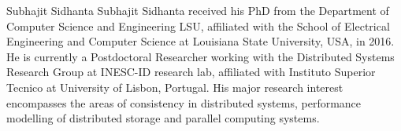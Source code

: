 \documentclass[journal,compsoc]{IEEEtran}
\begin{document}
%   
\begin{IEEEbiography}{Subhajit Sidhanta}
Subhajit Sidhanta received his PhD from the Department of Computer Science and Engineering
LSU, affiliated with the School of Electrical Engineering and Computer Science at Louisiana State University, USA, in 2016. He is currently a Postdoctoral Researcher working with the Distributed Systems Research Group at INESC-ID research lab, affiliated with Instituto Superior Tecnico at University of Lisbon, Portugal. His major research interest encompasses the areas of consistency in distributed systems, performance modelling of distributed storage and parallel computing systems.
\end{IEEEbiography}
\end{document}
